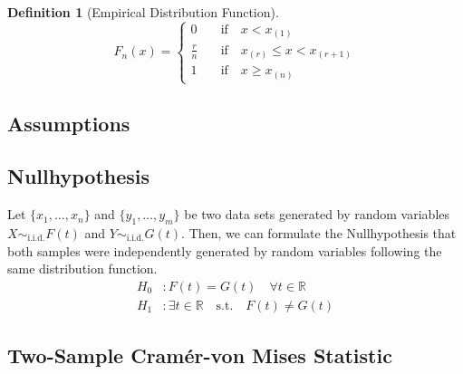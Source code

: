 \documentclass[12pt, a4paper]{article}
\theoremstyle{MAstyle} \newtheorem{assumption}{Assumption}[section]
\theoremstyle{MAstyle} \newtheorem{definition}{Definition}[section]
\theoremstyle{MAstyle} \newtheorem{theorem}{Theorem}[section]
\begin{document}
			\begin{definition}[Empirical Distribution Function]
				\begin{equation}
					F_{n}(x) = \begin{cases}
						0 & \quad \text{if} \quad  x < x_{(1)} \\
						\frac{r}{n} & \quad \text{if} \quad  x_{(r)} \leq x < x_{(r + 1)} \\
						1 & \quad \text{if} \quad  x \geq x_{(n)}
					\end{cases}
				\end{equation}
			\end{definition}
		
		\subsection{Assumptions}
		
		\subsection{Nullhypothesis}
			Let $\{x_1, \dots , x_n\}$ and $\{y_1, \dots , y_m\}$ be two data sets generated by random variables $X \sim_{\text{i.i.d.}} F(t)$ and $Y \sim_{\text{i.i.d.}} G(t)$.
			Then, we can formulate the Nullhypothesis that both samples were independently generated by random variables following the same distribution function.
			\begin{equation}
				\begin{split}
					H_0&: F(t) = G(t) \quad \forall t \in \mathbb{R}\\
					H_1&: \exists t \in \mathbb{R} \quad \text{s.t.} \quad F(t) \neq G(t)
				\end{split}
			\end{equation}
			
		\subsection{Two-Sample Cram\'{e}r-von Mises Statistic}\label{Two_sample_CvM}
			
\end{document}
